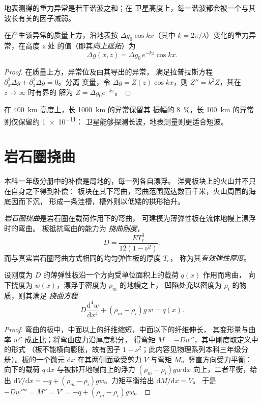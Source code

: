 地表测得的重力异常是若干谐波之和；在
卫星高度上，每一谐波都会被一个与其
波长有关的因子减弱。

\begin{proposition}[向上延拓]\label{prop:b3:gravity-geodesy:upward}
在产生该异常的质量上方，沿地表按
$\Delta g_0\cos kx$（其中 $k = 2\pi/\lambda$）变化的重力异常，在高度 $z$ 处
的值（即其\emph{向上延拓}）为
\[
  \Delta g(x, z) = \Delta g_0\,e^{-kz}\cos kx .
\]
\end{proposition}

\begin{proof}
在质量上方，异常位及由其导出的异常，
满足拉普拉斯方程 $\partial_x^2\Delta g + \partial_z^2\Delta g = 0$。分离
变量，令 $\Delta g = Z(z)\cos kx$，则 $Z'' = k^2Z$，其在 $z \to \infty$ 时有界的
解为 $Z = \Delta g_0e^{-kz}$。
\end{proof}

在 \qty{400}{km} 高度上，长 \qty{1000}{km} 的异常保留其
振幅的 \qty{8}{\percent}，长 \qty{100}{km} 的异常则仅保留约 \num{1e-11}：
卫星能够探测长波，地表测量则更适合短波。

\section{岩石圈挠曲}

本科一年级分册中的补偿是局地的，每一列各自漂浮。
洋壳板块上的火山并不只在自身之下得到补偿：
板块在其下弯曲，弯曲范围宽达数百千米，火山周围的海底因而下沉，
形成一条洼槽，槽外则以低矮的拱形抬升。

\begin{definition}\label{def:b3:gravity-geodesy:flexure}
\emph{岩石圈挠曲}是岩石圈在载荷作用下的弯曲，
可建模为薄弹性板在流体地幔上漂浮时的弯曲。
板抵抗弯曲的能力为
\emph{挠曲刚度}，
\[
  D = \frac{ET_e^3}{12(1 - \nu^2)},
\]
而与真实岩石圈弯曲方式相同的均匀弹性板的厚度 $T_e$，
称为其\emph{有效弹性厚度}。
\end{definition}

\begin{theorem}[薄板挠曲]\label{thm:b3:gravity-geodesy:plate}
设刚度为 $D$ 的薄弹性板沿一个方向受单位面积上的载荷 $q(x)$ 作用而弯曲，
向下挠度为 $w(x)$，漂浮于密度为 $\rho_m$ 的地幔之上，
凹陷处充以密度为 $\rho_i$ 的物质，则其满足
\emph{挠曲方程}
\[
  D\frac{\mathrm d^4w}{\mathrm dx^4} + (\rho_m - \rho_i)g\,w = q(x) .
\]
\end{theorem}

\begin{proof}
弯曲的板中，中面以上的纤维缩短，中面以下的纤维伸长，
其变形量与曲率 $w''$ 成正比；将弯曲应力沿厚度积分，
得弯矩 $M = -Dw''$，其中刚度取定义中的形式
（板不能横向膨胀，故有因子
$1 - \nu^2$；此内容见物理系列本科三年级分册）。板的一个微元 $\mathrm dx$
在其两侧面承受剪力 $V$ 与弯矩 $M$。竖直方向受力平衡：
向下的载荷 $q\,\mathrm dx$ 与被排开地幔向上的浮力
$(\rho_m - \rho_i)gw\,\mathrm dx$ 向上，二者平衡，给出 $\mathrm dV/\mathrm dx = -q +
(\rho_m - \rho_i)gw$。力矩平衡给出 $\mathrm dM/\mathrm dx = V$。
于是 $-Dw'''' = M'' = V' = -q + (\rho_m - \rho_i)gw$。
\end{proof}

